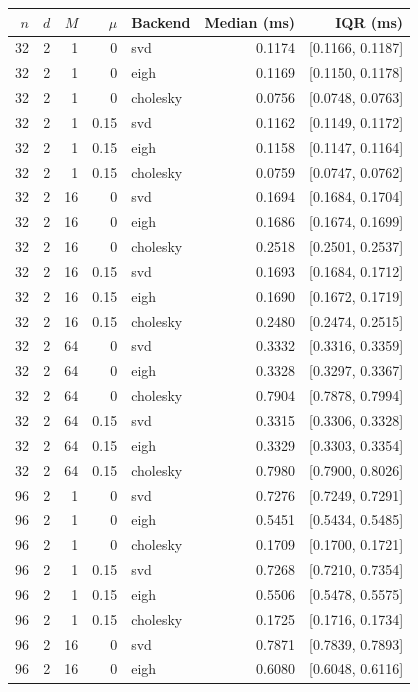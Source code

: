 \begin{tabular}{rrrrlrr}
\hline
$n$ & $d$ & $M$ & $\mu$ & Backend & Median (ms) & IQR (ms) \\
\hline
32 & 2 & 1 & 0 & svd & 0.1174 & [0.1166, 0.1187] \\
32 & 2 & 1 & 0 & eigh & 0.1169 & [0.1150, 0.1178] \\
32 & 2 & 1 & 0 & cholesky & 0.0756 & [0.0748, 0.0763] \\
32 & 2 & 1 & 0.15 & svd & 0.1162 & [0.1149, 0.1172] \\
32 & 2 & 1 & 0.15 & eigh & 0.1158 & [0.1147, 0.1164] \\
32 & 2 & 1 & 0.15 & cholesky & 0.0759 & [0.0747, 0.0762] \\
32 & 2 & 16 & 0 & svd & 0.1694 & [0.1684, 0.1704] \\
32 & 2 & 16 & 0 & eigh & 0.1686 & [0.1674, 0.1699] \\
32 & 2 & 16 & 0 & cholesky & 0.2518 & [0.2501, 0.2537] \\
32 & 2 & 16 & 0.15 & svd & 0.1693 & [0.1684, 0.1712] \\
32 & 2 & 16 & 0.15 & eigh & 0.1690 & [0.1672, 0.1719] \\
32 & 2 & 16 & 0.15 & cholesky & 0.2480 & [0.2474, 0.2515] \\
32 & 2 & 64 & 0 & svd & 0.3332 & [0.3316, 0.3359] \\
32 & 2 & 64 & 0 & eigh & 0.3328 & [0.3297, 0.3367] \\
32 & 2 & 64 & 0 & cholesky & 0.7904 & [0.7878, 0.7994] \\
32 & 2 & 64 & 0.15 & svd & 0.3315 & [0.3306, 0.3328] \\
32 & 2 & 64 & 0.15 & eigh & 0.3329 & [0.3303, 0.3354] \\
32 & 2 & 64 & 0.15 & cholesky & 0.7980 & [0.7900, 0.8026] \\
96 & 2 & 1 & 0 & svd & 0.7276 & [0.7249, 0.7291] \\
96 & 2 & 1 & 0 & eigh & 0.5451 & [0.5434, 0.5485] \\
96 & 2 & 1 & 0 & cholesky & 0.1709 & [0.1700, 0.1721] \\
96 & 2 & 1 & 0.15 & svd & 0.7268 & [0.7210, 0.7354] \\
96 & 2 & 1 & 0.15 & eigh & 0.5506 & [0.5478, 0.5575] \\
96 & 2 & 1 & 0.15 & cholesky & 0.1725 & [0.1716, 0.1734] \\
96 & 2 & 16 & 0 & svd & 0.7871 & [0.7839, 0.7893] \\
96 & 2 & 16 & 0 & eigh & 0.6080 & [0.6048, 0.6116] \\

\end{tabular}
